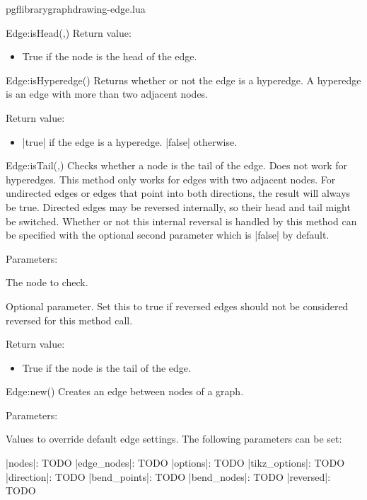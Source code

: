 \begin{filedescription}{pgflibrarygraphdrawing-edge.lua}
\begin{luacommand}{{Edge:isHead}(,)}
Return value:
\begin{itemize} \item[] True if the node is the head of the edge.  \end{itemize}


\end{luacommand}\begin{luacommand}{{Edge:isHyperedge}()}
Returns whether or not the edge is a hyperedge.  A hyperedge is an edge with more than two adjacent nodes. 


Return value:
\begin{itemize} \item[] |true| if the edge is a hyperedge. |false| otherwise.  \end{itemize}


\end{luacommand}\begin{luacommand}{{Edge:isTail}(,)}
Checks whether a node is the tail of the edge. Does not work for hyperedges.  This method only works for edges with two adjacent nodes.  For undirected edges or edges that point into both directions, the result will always be true.  Directed edges may be reversed internally, so their head and tail might be switched. Whether or not this internal reversal is handled by this method can be specified with the optional second  parameter which is |false| by default. 

Parameters:
\begin{parameterdescription}
	\item[\meta{node}] The node to check.\item[\meta{ignorereversed}] Optional parameter. Set this to true if reversed edges should not be considered reversed for this method call. 
\end{parameterdescription}


Return value:
\begin{itemize} \item[] True if the node is the tail of the edge.  \end{itemize}


\end{luacommand}\begin{luacommand}{{Edge:new}()}
Creates an edge between nodes of a graph. 

Parameters:
\begin{parameterdescription}
	\item[\meta{values}] Values to override default edge settings. The following parameters can be set:\par |nodes|: TODO |edge_nodes|: TODO |options|: TODO |tikz_options|: TODO |direction|: TODO |bend_points|: TODO |bend_nodes|: TODO |reversed|: TODO 
\end{parameterdescription}



\end{luacommand}
\end{filedescription}
